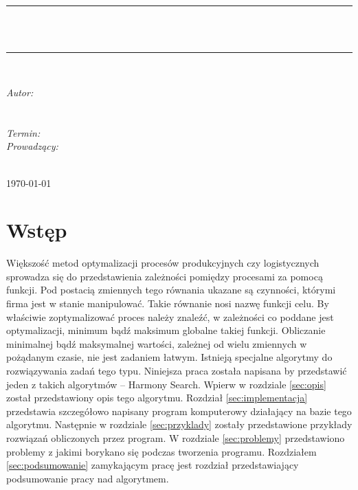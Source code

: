 \documentclass[10pt, a4paper]{article}
\begin{document}
\def\tablename{Tabela}	%
\begin{titlepage}
	\begin{center}
		\textsc{\LARGE \formakursu}\\[1cm]		
		\textsc{\Large \kurs}\\[0.5cm]		
		\rule{\textwidth}{0.08cm}\\[1cm]
		{\huge \bfseries \doctype}\\[1cm]
		\rule{\textwidth}{0.08cm}\\[1cm]
		\begin{flushright} \large
		\emph{Autor: }\\
		\osobaA\\
		\osobaB\\[0.4cm]
		\emph{Termin: }\termin\\[0.4cm]
		\emph{Prowadzący:} \\
		\prowadzacy \\
		\end{flushright}
		\vfill
		{\large \today}
	\end{center}	
\end{titlepage}
\newpage
\tableofcontents
\newpage

\section{Wstęp}
\label{sec:wstep}
Większość metod optymalizacji procesów produkcyjnych czy logistycznych sprowadza się do przedstawienia zależności pomiędzy procesami za pomocą funkcji. Pod postacią zmiennych tego równania ukazane są czynności, którymi firma jest w stanie manipulować. Takie równanie nosi nazwę funkcji celu. By właściwie zoptymalizować proces należy znaleźć, w zależności co poddane jest optymalizacji, minimum bądź maksimum globalne takiej funkcji. Obliczanie minimalnej bądź maksymalnej wartości, zależnej od wielu zmiennych w pożądanym czasie, nie jest zadaniem łatwym. Istnieją specjalne algorytmy do rozwiązywania zadań tego typu. Niniejsza praca została napisana by przedstawić jeden z takich algorytmów -- Harmony Search. Wpierw w rozdziale \ref{sec:opis} został przedstawiony opis tego algorytmu. Rozdział \ref{sec:implementacja} przedstawia szczegółowo napisany program komputerowy działający na bazie tego algorytmu. Następnie w rozdziale \ref{sec:przyklady} zostały przedstawione przykłady rozwiązań obliczonych przez program. W rozdziale \ref{sec:problemy} przedstawiono problemy z jakimi borykano się podczas tworzenia programu. Rozdziałem \ref{sec:podsumowanie} zamykającym pracę jest rozdział przedstawiający podsumowanie pracy nad algorytmem.
\end{document}
